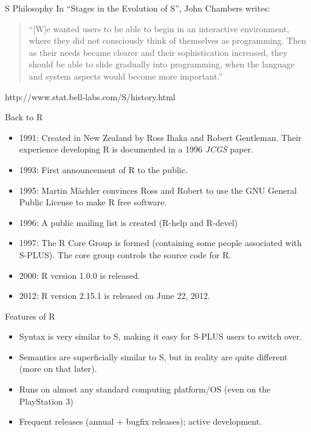 \documentclass[aspectratio=169]{beamer}
\begin{document}
\begin{frame}{S Philosophy}
In ``Stages in the Evolution of S'', John Chambers writes:
\begin{quote}
``[W]e wanted users to be able to begin in an interactive environment,
where they did not consciously think of themselves as
programming. Then as their needs became clearer and their
sophistication increased, they should be able to slide gradually into
programming, when the language and system aspects would become more
important.''
\end{quote}
http://www.stat.bell-labs.com/S/history.html
\end{frame}

\begin{frame}{Back to R}
\begin{itemize}
\item
1991: Created in New Zealand by Ross Ihaka and Robert Gentleman.
Their experience developing R is documented in a 1996 \textit{JCGS}
paper.
\item
1993: First announcement of R to the public.
\item
1995: Martin M\"achler convinces Ross and Robert to use the GNU
General Public License to make R free software.
\item
1996: A public mailing list is created (R-help and R-devel)
\item
1997: The R Core Group is formed (containing some people associated
with S-PLUS).  The core group controls the source code for R.
\item
2000: R version 1.0.0 is released.
\item
2012: R version 2.15.1 is released on June 22, 2012.
\end{itemize}
\end{frame}


\begin{frame}{Features of R}
\begin{itemize}
\item
Syntax is very similar to S, making it easy for S-PLUS users to switch
over.
\item
Semantics are superficially similar to S, but in reality are quite
different (more on that later).
\item
Runs on almost any standard computing platform/OS (even on the
PlayStation 3)
\item
Frequent releases (annual + bugfix releases); active development.
\end{itemize}
\end{frame}
\end{document}
